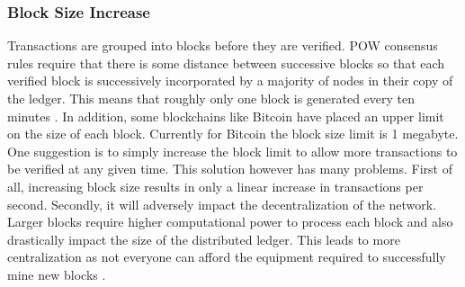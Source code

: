 \subsubsection{Block Size Increase} \label{BSI} 
Transactions are grouped into blocks before they are verified. POW consensus rules require that there is some distance between successive blocks so that each verified block is successively incorporated by a majority of nodes in their copy of the ledger. This means that roughly only one block is generated every ten minutes \cite{paper:001}. In addition, some blockchains like Bitcoin have placed an upper limit on the size of each block. Currently for Bitcoin the block size limit is 1 megabyte. One suggestion is to simply increase the block limit to allow more transactions to be verified at any given time.  This solution however has many problems. First of all, increasing block size results in only a linear increase in transactions per second. Secondly, it will adversely impact the decentralization of the network. Larger blocks require higher computational power to process each block and also drastically impact the size of the distributed ledger. This leads to more centralization as not everyone can afford the equipment required to successfully mine new blocks \cite{medium:006}.  
\vspace{0.5cm}  
